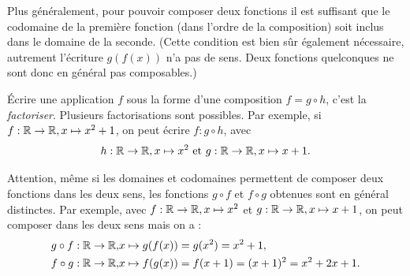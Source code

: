 Plus généralement, pour pouvoir composer deux fonctions il est suffisant que le codomaine de la première fonction (dans l'ordre de la composition) soit inclus dans le domaine de la seconde. (Cette condition est bien sûr également nécessaire, autrement l'écriture $g(f(x))$ n'a pas de sens. Deux fonctions quelconques ne sont donc en général pas composables.)

\begin{definition}
\'Ecrire une application $f$ sous la forme d'une composition $f = g\circ h$, c'est la \emph{factoriser}. Plusieurs factorisations sont possibles. Par exemple, si $f : \mathbb{R}\to \mathbb{R}, x\mapsto x^2+1$, on peut écrire $f : g\circ h$, avec
\[
h : \mathbb{R}\to \mathbb{R}, x\mapsto x^2 
\text{ et }
g : \mathbb{R}\to \mathbb{R}, x\mapsto x+1.
\]
\end{definition}

\noindent{}


\begin{attention}
Attention, même si les domaines et codomaines permettent de composer deux fonctions dans les deux sens, les fonctions $g\circ f$ et $f\circ g$ obtenues sont en général distinctes. Par exemple, avec $f : \mathbb{R}\to \mathbb{R}, x\mapsto x^2
$ et $g : \mathbb{R}\to \mathbb{R}, x\mapsto x+1$,  on peut composer dans les deux sens mais on a :
\begin{align*}
g\circ f : \mathbb{R}\to \mathbb{R}, & x\mapsto g(f(x)) = g(x^2) = x^2+1,\\
f\circ g : \mathbb{R}\to \mathbb{R}, & x\mapsto f(g(x)) = f(x+1) = (x+1)^2 = x^2+2x+1.
\end{align*}
\end{attention}


